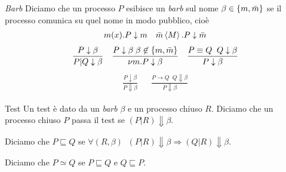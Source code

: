 \begin{frame}{\textit{Barb}}
  Diciamo che un processo $P$ esibisce un \textit{barb} sul nome
  $\beta \in \left\{m,\bar m\right\}$ se il processo comunica su quel nome in
  modo pubblico, cioè
  \begin{align*}
    m(x).P \downarrow m & & \bar m \left<M\right>.P \downarrow \bar m 
  \end{align*}
  \begin{align*}
    \frac{P\downarrow \beta}{ P|Q \downarrow \beta} & &
                                                        \frac{P\downarrow
                                                        \beta\; \beta
                                                      \not\in \left\{m,
                                                      \bar m\right\}}{ \nu
                                                      m. P \downarrow
                                                      \beta} & & \frac{
                                                               P
                                                               \equiv
                                                               Q \;\; Q
                                                               \downarrow
                                                               \beta}
                                                               {
                                                               P\downarrow
                                                               \beta}
  \end{align*}
  \begin{align*}
    \frac{P\downarrow \beta}{P\Downarrow \beta} & & \frac{P\rightarrow
                                                    Q\;\; Q \Downarrow
                                                    \beta }{P
                                                    \Downarrow \beta}
  \end{align*}
\end{frame}

\begin{frame}{Test}
  Un test è dato da un \textit{barb} $\beta$ e un processo chiuso
  $R$. Diciamo che un processo chiuso $P$ passa il test se $(P|R)
  \Downarrow \beta$.
  \vfill

  \begin{mydef}
    Diciamo che $P \sqsubseteq Q$ se
    $\forall (R,\beta)\;\; (P|R)\Downarrow \beta \Rightarrow
    (Q|R)\Downarrow \beta$.

    Diciamo che $P \simeq Q$ se $P \sqsubseteq Q$ e $Q \sqsubseteq P$.
  \end{mydef}
\end{frame}

